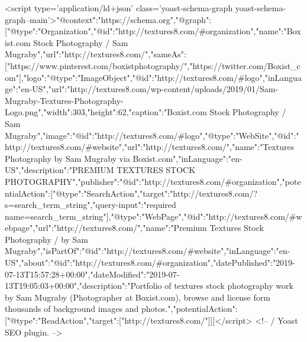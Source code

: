 <script type='application/ld+json' class='yoast-schema-graph yoast-schema-graph--main'>{"@context":"https://schema.org","@graph":[{"@type":"Organization","@id":"http://textures8.com/#organization","name":"Boxist.com Stock Photography / Sam Mugraby","url":"http://textures8.com/","sameAs":["https://www.pinterest.com/boxistphotography/","https://twitter.com/Boxist_com"],"logo":{"@type":"ImageObject","@id":"http://textures8.com/#logo","inLanguage":"en-US","url":"http://textures8.com/wp-content/uploads/2019/01/Sam-Mugraby-Textures-Photography-Logo.png","width":303,"height":62,"caption":"Boxist.com Stock Photography / Sam Mugraby"},"image":{"@id":"http://textures8.com/#logo"}},{"@type":"WebSite","@id":"http://textures8.com/#website","url":"http://textures8.com/","name":"Textures Photography by Sam Mugraby via Boxist.com","inLanguage":"en-US","description":"PREMIUM TEXTURES STOCK PHOTOGRAPHY","publisher":{"@id":"http://textures8.com/#organization"},"potentialAction":[{"@type":"SearchAction","target":"http://textures8.com/?s={search_term_string}","query-input":"required name=search_term_string"}]},{"@type":"WebPage","@id":"http://textures8.com/#webpage","url":"http://textures8.com/","name":"Premium Textures Stock Photography / by Sam Mugraby","isPartOf":{"@id":"http://textures8.com/#website"},"inLanguage":"en-US","about":{"@id":"http://textures8.com/#organization"},"datePublished":"2019-07-13T15:57:28+00:00","dateModified":"2019-07-13T19:05:03+00:00","description":"Portfolio of textures stock photography work by Sam Mugraby (Photographer at Boxist.com), browse and license form thousands of background images and photos.","potentialAction":[{"@type":"ReadAction","target":["http://textures8.com/"]}]}]}</script>
<!-- / Yoast SEO plugin. -->

